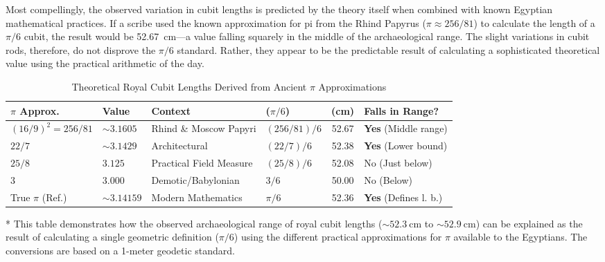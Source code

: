 \documentclass[11pt]{article}
\begin{document}
Most compellingly, the observed variation in cubit lengths is predicted by the theory itself when combined with known Egyptian mathematical practices. If a scribe used the known approximation for pi from the Rhind Papyrus ($\pi \approx 256/81$) to calculate the length of a $\pi/6$ cubit, the result would be \SI{52.67}{\centi\meter}---a value falling squarely in the middle of the archaeological range. The slight variations in cubit rods, therefore, do not disprove the $\pi/6$ standard. Rather, they appear to be the predictable result of calculating a sophisticated theoretical value using the practical arithmetic of the day.

\begin{table}[h!]
\centering
\begin{threeparttable}
    \caption{Theoretical Royal Cubit Lengths Derived from Ancient $\pi$ Approximations}
    \label{tbl:pi_approximations}
    \begin{tabular}{l l l l S[table-format=2.2] l}
        \toprule
        \textbf{$\pi$ Approx.} & \textbf{Value} & \textbf{Context} & \textbf{($\pi/6$)} & {\textbf{(cm)}} & \textbf{Falls in Range?} \\
        \midrule
        $(16/9)^2 = 256/81$ & $\sim3.1605$  & Rhind \& Moscow Papyri & $(256/81) / 6$ & 52.67 & \textbf{Yes} (Middle range) \\
        \addlinespace
        $22/7$              & $\sim3.1429$  & Architectural          & $(22/7) / 6$   & 52.38 & \textbf{Yes} (Lower bound) \\
        \addlinespace
        $25/8$              & $3.125$       & Practical Field Measure  & $(25/8) / 6$   & 52.08 & No (Just below) \\
        \addlinespace
        $3$                 & $3.000$       & Demotic/Babylonian       & $3 / 6$        & 50.00 & No (Below) \\
        \midrule %
        True $\pi$ (Ref.) & $\sim3.14159$ & Modern Mathematics     & $\pi / 6$      & 52.36 & \textbf{Yes} (Defines l. b.) \\
        \bottomrule
    \end{tabular}
    \begin{tablenotes}[flushleft] %
      \small %
      \item[*] This table demonstrates how the observed archaeological range of royal cubit lengths ($\sim\SI{52.3}{\centi\meter}$ to $\sim\SI{52.9}{\centi\meter}$) can be explained as the result of calculating a single geometric definition ($\pi/6$) using the different practical approximations for $\pi$ available to the Egyptians. The conversions are based on a 1-meter geodetic standard.
    \end{tablenotes}
\end{threeparttable}
\end{table}
\end{document}
